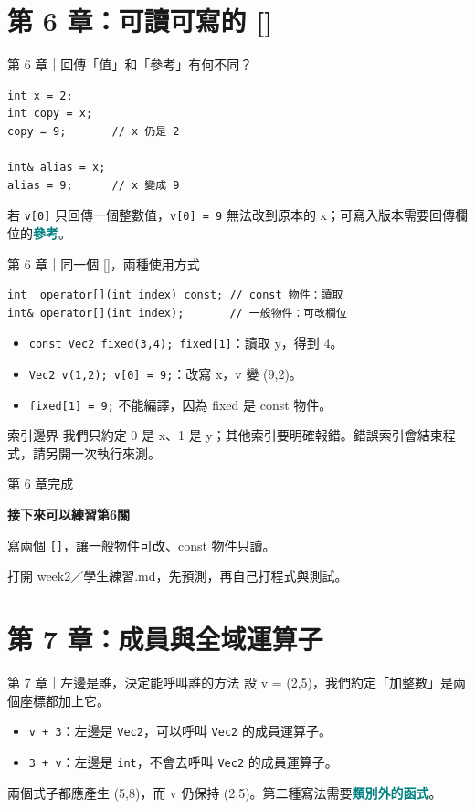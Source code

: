 \documentclass[aspectratio=169,11pt]{beamer}
\newcommand{\key}[1]{\textcolor{teal}{\textbf{#1}}}
\newcommand{\practice}[2]{%
  \begin{frame}[plain]
    \vspace*{1.5cm}
    {\large\color{muted} 第 #1 章完成}\par\vspace{0.45cm}
    {\Huge\bfseries\color{teal} 接下來可以練習第#1關}\par\vspace{0.7cm}
    {\Large #2}\par\vfill
    {\small\color{muted} 打開 week2／學生練習.md，先預測，再自己打程式與測試。}
  \end{frame}
}
\begin{document}
\section{第 6 章：可讀可寫的 []}
\begin{frame}[fragile]{第 6 章｜回傳「值」和「參考」有何不同？}
\begin{lstlisting}
int x = 2;
int copy = x;
copy = 9;       // x 仍是 2

int& alias = x;
alias = 9;      // x 變成 9
\end{lstlisting}
  若 \texttt{v[0]} 只回傳一個整數值，\texttt{v[0] = 9} 無法改到原本的 x；可寫入版本需要回傳欄位的\key{參考}。
\end{frame}

\begin{frame}[fragile]{第 6 章｜同一個 []，兩種使用方式}
\begin{lstlisting}
int  operator[](int index) const; // const 物件：讀取
int& operator[](int index);       // 一般物件：可改欄位
\end{lstlisting}
  \begin{itemize}
    \item \texttt{const Vec2 fixed(3,4); fixed[1]}：讀取 y，得到 4。
    \item \texttt{Vec2 v(1,2); v[0] = 9;}：改寫 x，v 變 (9,2)。
    \item \texttt{fixed[1] = 9;} 不能編譯，因為 fixed 是 const 物件。
  \end{itemize}
  \begin{block}{索引邊界}
    我們只約定 0 是 x、1 是 y；其他索引要明確報錯。錯誤索引會結束程式，請另開一次執行來測。
  \end{block}
\end{frame}
\practice{6}{寫兩個 \texttt{[]}，讓一般物件可改、const 物件只讀。}

\section{第 7 章：成員與全域運算子}
\begin{frame}{第 7 章｜左邊是誰，決定能呼叫誰的方法}
  設 v = (2,5)，我們約定「加整數」是兩個座標都加上它。
  \begin{itemize}
    \item \texttt{v + 3}：左邊是 \texttt{Vec2}，可以呼叫 \texttt{Vec2} 的成員運算子。
    \item \texttt{3 + v}：左邊是 \texttt{int}，不會去呼叫 \texttt{Vec2} 的成員運算子。
  \end{itemize}
  \vspace{0.5em}
  兩個式子都應產生 (5,8)，而 v 仍保持 (2,5)。第二種寫法需要\key{類別外的函式}。
\end{frame}
\end{document}
